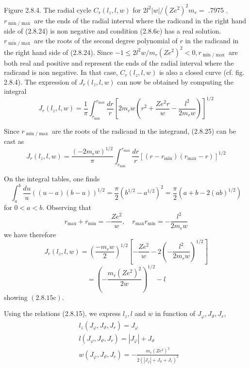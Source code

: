 \documentclass{article}
\begin{document}
Figure 2.8.4. The radial cycle $C_{r}\left(l_{z}, l, w\right)$ for $2 l^{2}|w| /\left(Z e^{2}\right)^{2} m_{r}=$ .7975 .
$r_{\min / \max }$ are the ends of the radial interval where the radicand in the right hand side of (2.8.24) is non negative and condition (2.8.6c) has a real solution. $r_{\min / \max }$ are the roots of the second degree polynomial of $r$ in the radicand in the right hand side of (2.8.24). Since $-1 \leq 2 l^{2} w / m_{r}\left(Z e^{2}\right)^{2}<0, r_{\min / \max }$ are both real and positive and represent the ends of the radial interval where the radicand is non negative. In that case, $C_{r}\left(l_{z}, l, w\right)$ is also a closed curve (cf. fig. 2.8.4). The expression of $J_{r}\left(l_{z}, l, w\right)$ can now be obtained by computing the integral
$$
\begin{equation*}
J_{r}\left(l_{z}, l, w\right)=\frac{1}{\pi} \int_{r_{\min }}^{r_{\max }} \frac{d r}{r}\left[2 m_{r} w\left(r^{2}+\frac{Z e^{2} r}{w}-\frac{l^{2}}{2 m_{r} w}\right)\right]^{1 / 2} \tag{2.8.25}
\end{equation*}
$$

Since $r_{\min / \max }$ are the roots of the radicand in the integrand, (2.8.25) can be cast as
$$
\begin{equation*}
J_{r}\left(l_{z}, l, w\right)=\frac{\left(-2 m_{r} w\right)^{1 / 2}}{\pi} \int_{r_{\min }}^{r_{\max }} \frac{d r}{r}\left[\left(r-r_{\min }\right)\left(r_{\max }-r\right)\right]^{1 / 2} \tag{2.8.26}
\end{equation*}
$$

On the integral tables, one finds
$$
\int_{a}^{b} \frac{d u}{u}((u-a)(b-u))^{1 / 2}=\frac{\pi}{2}\left(b^{1 / 2}-a^{1 / 2}\right)^{2}=\frac{\pi}{2}\left(a+b-2(a b)^{1 / 2}\right)
$$
for $0<a<b$. Observing that
$$
\begin{equation*}
r_{\max }+r_{\min }=-\frac{Z e^{2}}{w}, \quad r_{\max } r_{\min }=-\frac{l^{2}}{2 m_{r} w} \tag{2.8.27}
\end{equation*}
$$
we have therefore
$$
\begin{equation*}
J_{r}\left(l_{z}, l, w\right)=\left(\frac{-m_{r} w}{2}\right)^{1 / 2}\left[-\frac{Z e^{2}}{w}-2\left(-\frac{l^{2}}{2 m_{r} w}\right)^{1 / 2}\right] \tag{2.8.28}
\end{equation*}
$$
$$
=\left(-\frac{m_{r}\left(Z e^{2}\right)^{2}}{2 w}\right)^{1 / 2}-l
$$
showing $(2.8 .15 \mathrm{c})$.

Using the relations (2.8.15), we express $l_{z}, l$ and $w$ in function of $J_{\varphi}, J_{\vartheta}, J_{r}$,
$$
\begin{align*}
& l_{z}\left(J_{\varphi}, J_{\vartheta}, J_{r}\right)=J_{\varphi}  \tag{2.8.29a}\\
& l\left(J_{\varphi}, J_{\vartheta}, J_{r}\right)=\left|J_{\varphi}\right|+J_{\vartheta}  \tag{2.8.29b}\\
& w\left(J_{\varphi}, J_{\vartheta}, J_{r}\right)=-\frac{m_{r}\left(Z e^{2}\right)^{2}}{2\left(\left|J_{\varphi}\right|+J_{\vartheta}+J_{r}\right)^{2}} \tag{2.8.29c}
\end{align*}
$$
\end{document}
